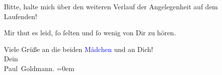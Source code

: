 \pstart
            Bitte, halte mich über den weiteren Verlauf der Angelegenheit auf dem
               Laufenden!\pend
           
\pstart
           Mir thut es leid, ſo ſelten und ſo wenig von {\pb}Dir zu
               hören.\pend
           
\pstart
           Viele Grüße an die beiden \textcolor{blue}{Mädchen}{}\ledrightnote{{$\rightarrow$}\textcolor{blue}{Olga Schnitzler}{\newline}{$\rightarrow$}\textcolor{blue}{Elisabeth Steinrück}} und an Dich! {\\[\baselineskip]}Dein {\\[\baselineskip]}\spacefill\mbox{Paul Goldmann.}\pend
           \leftskip=0em{}\endnumbering{}  
      